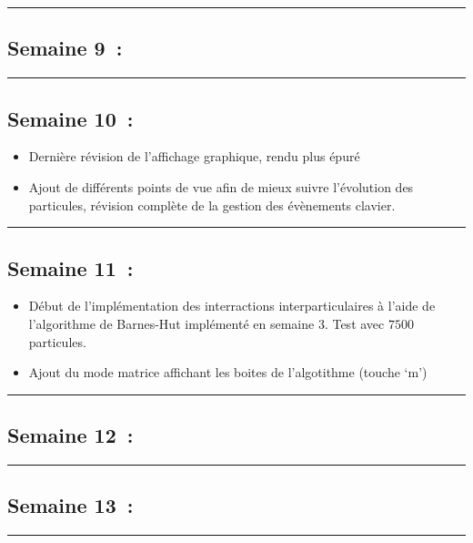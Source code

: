 \documentclass[12pt, letterpaper, twoside]{article}
\begin{document}
\rule{\textwidth}{0.4pt}

\subsection{Semaine 9 :}

\rule{\textwidth}{0.4pt}

\subsection{Semaine 10 :}
\begin{itemize}
\item Dernière révision de l'affichage graphique, rendu plus épuré
\item Ajout de différents points de vue afin de mieux suivre l'évolution des particules, révision complète de la gestion des évènements clavier.
\end{itemize}

\rule{\textwidth}{0.4pt}

\subsection{Semaine 11 :}

\begin{itemize}
\item Début de l'implémentation des interractions interparticulaires à l'aide de l'algorithme de Barnes-Hut implémenté en semaine 3. Test avec $7500$ particules. 
\item Ajout du mode matrice affichant les boites de l'algotithme (touche `m')
\end{itemize}

\rule{\textwidth}{0.4pt}

\subsection{Semaine 12 :}

\rule{\textwidth}{0.4pt}

\subsection{Semaine 13 :}

\rule{\textwidth}{0.4pt}
\end{document}
